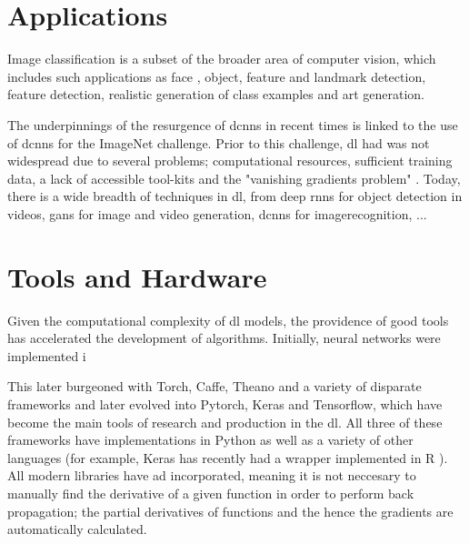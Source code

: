 

\section{Applications}

Image classification is a subset of the broader area of computer vision, which includes such applications as face , object, feature and landmark detection, feature detection, realistic  generation of class examples and art generation.  
\bigskip

The underpinnings of the resurgence of \gls{dcnn}s in recent times is linked to the use of \gls{dcnn}s for the ImageNet challenge. Prior to this challenge, \gls{dl} had was not widespread due to several problems; computational resources, sufficient training data, a lack of accessible tool-kits and the "vanishing gradients problem" \cite[Chapter~8]{good_fellow_2016} \cite[p.~93-94]{dl_overview}. Today, there is a wide breadth of techniques in \gls{dl}, from deep \gls{rnn}s for object detection in videos, \gls{gan}s for image and video generation, \gls{dcnn}s for \gls{imagerecognition}, ... 


\section{Tools and Hardware}

Given the computational complexity of  \gls{dl} models, the providence of good tools has accelerated the development of algorithms.  Initially, neural networks were implemented i

This later burgeoned with Torch, Caffe, Theano and a variety of disparate frameworks and later evolved into Pytorch, Keras and Tensorflow, which have become the main tools of research and production in the \gls{dl}. All three of these frameworks have implementations in Python as well as a variety of other languages (for example, Keras has recently had a wrapper implemented in R \cite{keras_r}). All modern libraries have \gls{ad} incorporated, meaning it is not neccesary to manually find the derivative of a given function in order to perform back propagation; the partial derivatives of functions and the hence the gradients are automatically calculated.  \bigskip

